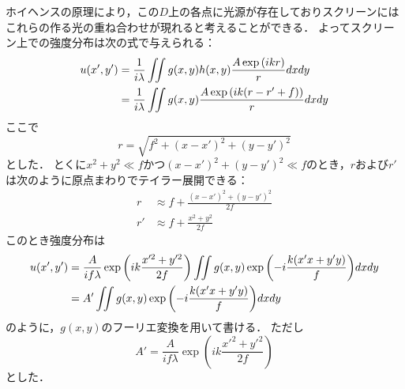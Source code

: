 \documentclass[titlepage]{jsarticle}
\begin{document}
ホイヘンスの原理により，この$D$上の各点に光源が存在しておりスクリーンにはこれらの作る光の重ね合わせが現れると考えることができる．
よってスクリーン上での強度分布は次の式で与えられる：
\begin{align}
    u(x',y') &= \frac{1}{i\lambda} \iint g(x,y)h(x,y) \frac{A\exp{(ikr)}}{r} dxdy \notag\\
    &= \frac{1}{i\lambda} \iint g(x,y) \frac{A\exp{(ik(r-r'+f))}}{r} dxdy
\end{align}
ここで
\begin{equation}
    r = \sqrt{f^2 + (x-x')^2 + (y-y')^2}
\end{equation}
とした．
とくに$x^2 + y^2 \ll f$かつ$(x-x')^2 + (y-y')^2 \ll f$のとき，$r$および$r'$は次のように原点まわりでテイラー展開できる：
\begin{align}
    r &\approx f + \frac{(x-x')^2 + (y-y')^2}{2f} \\
    r' &\approx f + \frac{x^2 + y^2}{2f} 
\end{align}
このとき強度分布は
\begin{align}
    u(x',y') &= \frac{A}{if\lambda}\exp{\left(ik\frac{x'^2 + y'^2}{2f}\right)} \iint g(x,y) \exp{\left(-i\frac{k(x'x + y'y)}{f}\right)}dxdy \notag\\
    &= A'\iint g(x,y) \exp{\left(-i\frac{k(x'x + y'y)}{f}\right)} dxdy \label{foulier}
\end{align}
のように，$g(x,y)$のフーリエ変換を用いて書ける．
ただし
\begin{equation}
    A' = \frac{A}{if\lambda}\exp{\left(ik\frac{x'^2 + y'^2}{2f}\right)} 
\end{equation}
とした．
\end{document}
